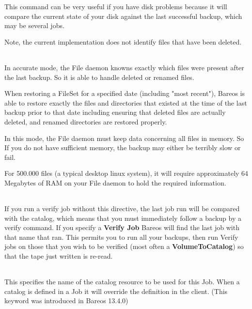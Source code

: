 \begin{description}
\begin{description}
This command can be very useful if you have disk problems because it
will compare the current state of your disk against the last successful
backup, which may be several jobs.

Note, the current implementation does not identify files that
have been deleted.
\end{description}

\item [Accurate = {\textless}yes{\textbar}no{\textgreater}] \hfill \\
In accurate mode, the File daemon knowns exactly which files were present
after the last backup. So it is able to handle deleted or renamed files.

When restoring a FileSet for a specified date (including "most
recent"), Bareos is able to restore exactly the files and
directories that existed at the time of the last backup prior to
that date including ensuring that deleted files are actually deleted,
and renamed directories are restored properly.

In this mode, the File daemon must keep data concerning all files in
memory.  So If you do not have sufficient memory, the backup may
either be terribly slow or fail.


For 500.000 files (a typical desktop linux system), it will require
approximately 64 Megabytes of RAM on your File daemon to hold the
required information.

\item [Verify Job = {\textless}Job-Resource-Name{\textgreater}] \hfill \\
If you run a verify job without this directive, the last job run will be
compared with the catalog, which means that you must immediately follow
a backup by a verify command.  If you specify a {\bf Verify Job} Bareos
will find the last job with that name that ran.  This permits you to run
all your backups, then run Verify jobs on those that you wish to be
verified (most often a {\bf VolumeToCatalog}) so that the tape just
written is re-read.

\item [Catalog = {\textless}Catalog-resource-name{\textgreater}] \hfill \\
This specifies the name of the catalog resource to be used for this Job.
When a catalog is defined in a Job it will override the definition in
the client. (This keyword was introduced in Bareos 13.4.0)


\end{description}
